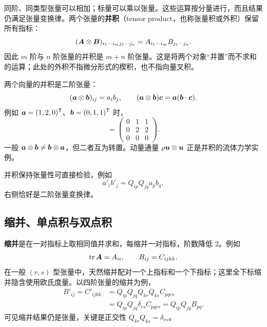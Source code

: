 同阶、同类型张量可以相加；标量可以乘以张量。这些运算按分量进行，而且结果仍满足张量变换律。两个张量的\textbf{并积}（tensor product，也称张量积或外积）保留所有指标：
\begin{equation}
 (\bm{A}\otimes\bm{B})_{i_1\cdots i_mj_1\cdots j_n}
 =A_{i_1\cdots i_m}B_{j_1\cdots j_n}.
\end{equation}
因此 $m$ 阶与 $n$ 阶张量的并积是 $m+n$ 阶张量。这是将两个对象“并置”而不求和的运算；此处的外积不指微分形式的楔积，也不指向量叉积。

两个向量的并积是二阶张量：
\begin{equation}
 (\bm{a}\otimes\bm{b})_{ij}=a_ib_j,\qquad
 (\bm{a}\otimes\bm{b})\bm{c}=\bm{a}(\bm{b}\cdot\bm{c}).
\end{equation}
例如 $\bm{a}=(1,2,0)^{\mathsf T}$、$\bm{b}=(0,1,1)^{\mathsf T}$ 时，
\begin{equation}
 [\vct a\otimes\vct b]=
 \begin{pmatrix}0&1&1\\0&2&2\\0&0&0\end{pmatrix}.
\end{equation}
一般 $\bm{a}\otimes\bm{b}\ne\bm{b}\otimes\bm{a}$，但二者互为转置。动量通量 $\rho\bm{u}\otimes\bm{u}$ 正是并积的流体力学实例。

并积保持张量性可直接检验，例如
\begin{equation}
 a'_ib'_j=Q_{ip}Q_{jq}a_pb_q,
\end{equation}
右侧恰好是二阶张量变换律。

\subsection{缩并、单点积与双点积}\label{subsec:tensor-contraction}

\textbf{缩并}是在一对指标上取相同值并求和，每缩并一对指标，阶数降低 $2$。例如
\begin{equation}
 \operatorname{tr}\bm{A}=A_{ii},\qquad B_{ij}=C_{ijkk}.
\end{equation}
在一般 $(r,s)$ 型张量中，天然缩并配对一个上指标和一个下指标；这里全下标缩并隐含使用欧氏度量。以四阶张量的缩并为例，
\begin{align}
 B'_{ij}=C'_{ijkk}
 &=Q_{ip}Q_{jq}Q_{kr}Q_{ks}C_{pqrs}\\
 &=Q_{ip}Q_{jq}\delta_{rs}C_{pqrs}
 =Q_{ip}Q_{jq}B_{pq}.
\end{align}
可见缩并结果仍是张量，关键是正交性 $Q_{kr}Q_{ks}=\delta_{rs}$。


